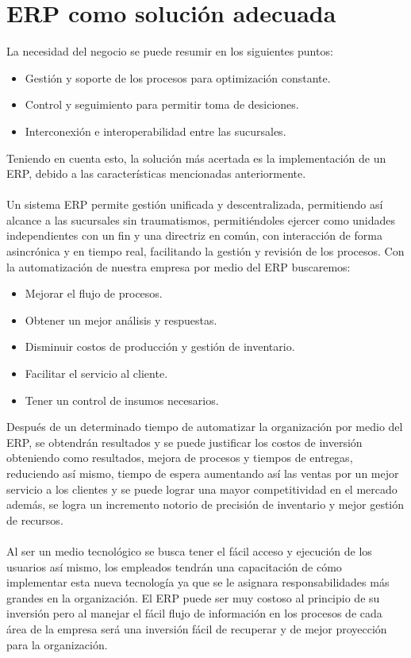 \section{ERP como soluci\'on adecuada}
%
La necesidad del negocio se puede resumir en los siguientes puntos:%
%
\begin{itemize}
\item Gesti\'on y soporte de los procesos para optimizaci\'on constante.
\item Control y seguimiento para permitir toma de desiciones.
\item Interconexi\'on e interoperabilidad entre las sucursales.
\end{itemize}
%
Teniendo en cuenta esto, la soluci\'on m\'as acertada es la implementaci\'on de un ERP, debido a las caracter\'isticas mencionadas anteriormente.%
\\%
\\%
Un sistema ERP permite gesti\'on unificada y descentralizada, permitiendo as\'i alcance a las sucursales sin traumatismos, permiti\'endoles ejercer como unidades independientes con un fin y una directriz en com\'un, con interacci\'on de forma asincr\'onica y en tiempo real, facilitando la gesti\'on y revisi\'on de los procesos.%
Con la automatizaci\'on de nuestra empresa por medio del ERP buscaremos:
%
\begin{itemize}
	\item Mejorar el flujo de procesos. 
	\item Obtener un mejor an\'alisis y respuestas.
	\item Disminuir costos de producci\'on y gesti\'on de inventario.
	\item Facilitar el servicio al cliente.
	\item Tener un control de insumos necesarios.
\end{itemize}
%
Despu\'es de un determinado tiempo de automatizar la organizaci\'on por medio del ERP, se obtendr\'an resultados y se puede justificar los costos de inversi\'on obteniendo como resultados, mejora de procesos y tiempos de entregas, reduciendo as\'i mismo, tiempo de espera  aumentando as\'i las ventas por un mejor servicio a los clientes y se puede lograr una mayor competitividad  en el mercado adem\'as, se logra un incremento notorio de precisi\'on de inventario y mejor gesti\'on de recursos.%
\\%
\\%
Al ser un medio tecnol\'ogico se busca tener el f\'acil acceso y ejecuci\'on de los usuarios as\'i mismo, los empleados tendr\'an una capacitaci\'on de c\'omo implementar esta nueva tecnolog\'ia ya que se le asignara responsabilidades m\'as grandes en la organizaci\'on. El ERP puede ser muy costoso al principio de su inversi\'on pero al manejar el f\'acil flujo de informaci\'on en los procesos de cada \'area de la empresa ser\'a una inversi\'on f\'acil de recuperar y de mejor proyecci\'on para la organizaci\'on.%